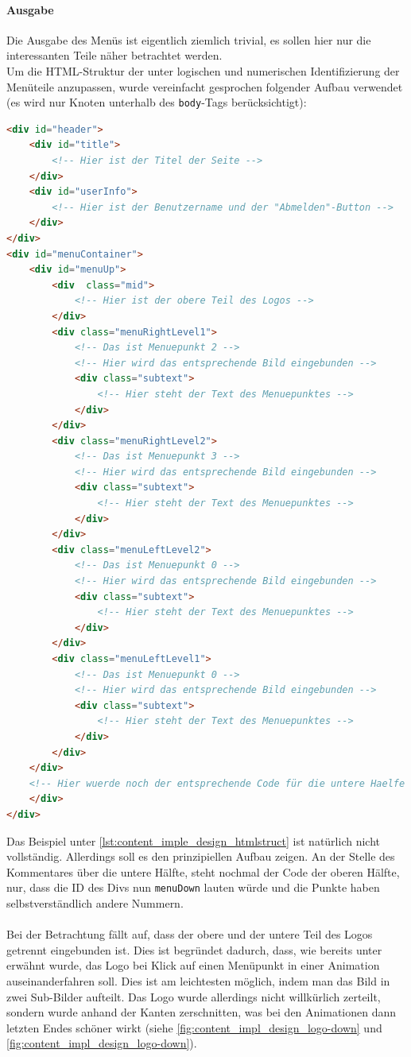 \paragraph{Ausgabe\\}
Die Ausgabe des Menüs ist eigentlich ziemlich trivial, es sollen hier nur die interessanten Teile näher betrachtet werden.\\
Um die HTML-Struktur der unter logischen und numerischen Identifizierung der Menüteile anzupassen, wurde vereinfacht gesprochen folgender Aufbau verwendet (es wird nur Knoten unterhalb des \texttt{body}-Tags berücksichtigt):
\begin{lstlisting}[style=custom, language=html,  caption={Grundsätzliche HTML-Struktur der Menüs},label={lst:content_imple_design_htmlstruct}]
<div id="header">
	<div id="title">
		<!-- Hier ist der Titel der Seite -->
	</div>
	<div id="userInfo">
		<!-- Hier ist der Benutzername und der "Abmelden"-Button -->
	</div>
</div>
<div id="menuContainer">
	<div id="menuUp">
		<div  class="mid">
			<!-- Hier ist der obere Teil des Logos -->
		</div>
		<div class="menuRightLevel1">
			<!-- Das ist Menuepunkt 2 -->
			<!-- Hier wird das entsprechende Bild eingebunden -->
			<div class="subtext">
				<!-- Hier steht der Text des Menuepunktes -->
			</div>
		</div>
		<div class="menuRightLevel2">
			<!-- Das ist Menuepunkt 3 -->
			<!-- Hier wird das entsprechende Bild eingebunden -->
			<div class="subtext">
				<!-- Hier steht der Text des Menuepunktes -->
			</div>
		</div>
		<div class="menuLeftLevel2">
			<!-- Das ist Menuepunkt 0 -->
			<!-- Hier wird das entsprechende Bild eingebunden -->
			<div class="subtext">
				<!-- Hier steht der Text des Menuepunktes -->
			</div>
		</div>
		<div class="menuLeftLevel1">
			<!-- Das ist Menuepunkt 0 -->
			<!-- Hier wird das entsprechende Bild eingebunden -->
			<div class="subtext">
				<!-- Hier steht der Text des Menuepunktes -->
			</div>
		</div>
	</div>
	<!-- Hier wuerde noch der entsprechende Code für die untere Haelfe kommen -->
	</div>
</div>
\end{lstlisting}
Das Beispiel unter \autoref{lst:content_imple_design_htmlstruct} ist natürlich nicht vollständig. Allerdings soll es den prinzipiellen Aufbau zeigen. An der Stelle des Kommentares über die untere Hälfte, steht nochmal der Code der oberen Hälfte, nur, dass die ID des Divs nun \texttt{menuDown} lauten würde und die Punkte haben selbstverständlich andere Nummern.\\
\\
Bei der Betrachtung fällt auf, dass der obere und der untere Teil des Logos getrennt eingebunden ist. Dies ist begründet dadurch, dass, wie bereits unter  erwähnt wurde, das Logo bei Klick auf einen Menüpunkt in einer Animation auseinanderfahren soll. Dies ist am leichtesten möglich, indem man das Bild in zwei Sub-Bilder aufteilt. Das Logo wurde allerdings nicht willkürlich zerteilt, sondern wurde anhand der Kanten zerschnitten, was bei den Animationen dann letzten Endes schöner wirkt (siehe \autoref{fig:content_impl_design_logo-down} und \autoref{fig:content_impl_design_logo-down}).\\
